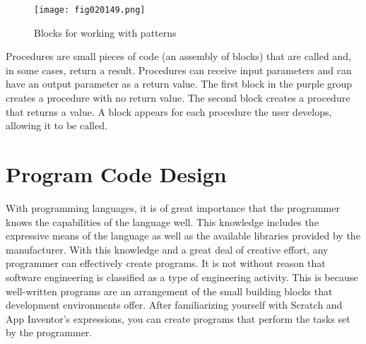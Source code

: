 \begin{figure}[H]
   \centering
   \texttt{[image: fig020149.png]}
   \caption{Blocks for working with patterns}
\label{fig020149}
\end{figure}

Procedures are small pieces of code (an assembly of blocks) that are called and, in some cases, return a result. Procedures can receive input parameters and can have an output parameter as a return value. The first block in the purple group creates a procedure with no return value. The second block creates a procedure that returns a value. A block appears for each procedure the user develops, allowing it to be called.

\section{Program Code Design}

With programming languages, it is of great importance that the programmer knows the capabilities of the language well. This knowledge includes the expressive means of the language as well as the available libraries provided by the manufacturer. With this knowledge and a great deal of creative effort, any programmer can effectively create programs. It is not without reason that software engineering is classified as a type of engineering activity. This is because well-written programs are an arrangement of the small building blocks that development environments offer. After familiarizing yourself with Scratch and App Inventor's expressions, you can create programs that perform the tasks set by the programmer.


